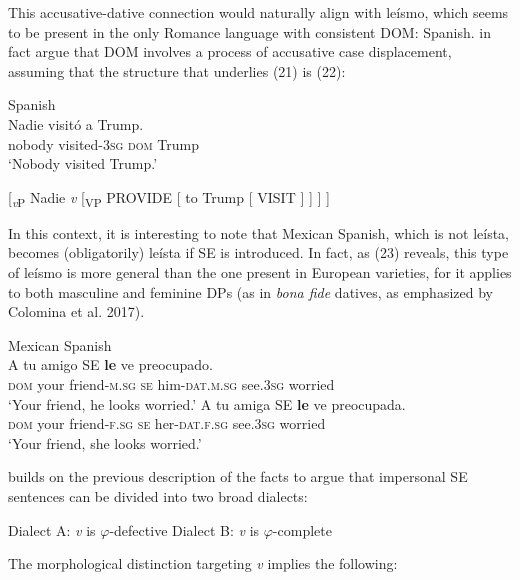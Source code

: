 \documentclass[output=paper]{langsci/langscibook}
\begin{document}
This accusative-dative connection would naturally align with leísmo, which seems to be present in the only Romance language with consistent DOM: Spanish. \citet{ColominaEtAl2017} in fact argue that DOM involves a process of accusative case displacement, assuming that the structure that underlies (21) is (22):

\ea%
    Spanish\label{ex:gallego:21}\\
    \gll Nadie    visitó             a          Trump.   \\
         nobody  visited\textsc{{}-3}\textsc{sg  dom}   Trump\\
    \glt ‘Nobody visited Trump.’
    \z

\ea%
    \label{ex:gallego:22}
    [\textit{\textsubscript{v}}\textsubscript{P} Nadie \textit{v} [\textsubscript{VP} PROVIDE [ to Trump [ VISIT ] ] ] ]
\z

          

In this context, it is interesting to note that Mexican Spanish, which is not leísta, becomes (obligatorily) leísta if SE is introduced. In fact, as (23) reveals, this type of leísmo is more general than the one present in European varieties, for it applies to both masculine and feminine DPs (as in \textit{bona fide} datives, as emphasized by Colomina et al. 2017).

\ea%
    Mexican Spanish\label{ex:gallego:23}\\
    \ea
    \gll A       tu      amigo         SE  \textbf{le} ve         preocupado.  \\
         \textsc{dom}   your friend\textsc{{}-m.}\textsc{sg} \textsc{se}   him\textsc{{}-dat.m.}\textsc{sg}  see\textsc{.3sg} worried\\
    \glt ‘Your friend, he looks worried.’
    \ex
    \gll A       tu      amiga        SE  \textbf{le} ve          preocupada. \\
         \textsc{dom}   your friend\textsc{{}-f.}\textsc{sg} \textsc{se}   her\textsc{{}-dat.f.}\textsc{sg} see\textsc{.3sg} worried\\
    \glt ‘Your friend, she looks worried.’
    \z
\z

\citet{Gallego2016} builds on the previous description of the facts to argue that impersonal SE sentences can be divided into two broad dialects:

\ea%
    \label{ex:gallego:24}
    \ea Dialect A: \textit{v} is $\varphi ${}-defective
    \ex Dialect B: \textit{v} is $\varphi ${}-complete
    \z
\z

The morphological distinction targeting \textit{v} implies the following:
\end{document}
